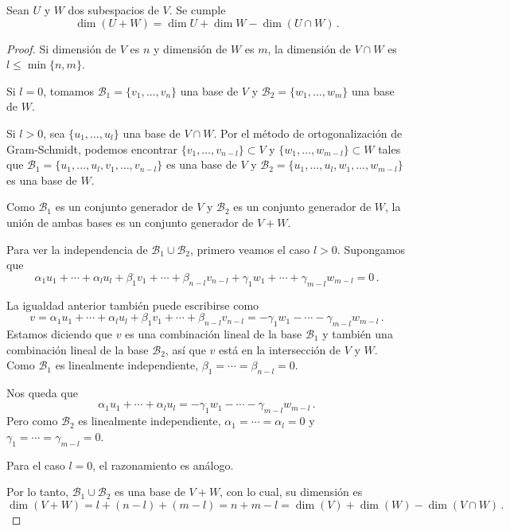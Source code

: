 \begin{prop}
  \label{prop:formula-dimension}
  Sean $U$ y $W$ dos subespacios de $V$. Se cumple
  \[
    \dim(U+W) = \dim U + \dim W - \dim(U\cap W)\,.
  \]
\end{prop}
\begin{proof}
  Si dimensión de $V$ es $n$ y dimensión de $W$ es $m$, la dimensión de $V\cap W$ es $l\leq\min\{n,m\}$.

  Si $l=0$, tomamos $\mathcal{B}_1 = \{v_1,\dots,v_{n}\}$ una base de $V$ y $\mathcal{B}_2 = \{w_1,\dots,w_{m}\}$ una base de $W$.

  Si $l>0$, sea $\{u_1,\dots,u_{l}\}$ una base de $V\cap W$. Por el método de ortogonalización de Gram-Schmidt, podemos encontrar $\{v_1,\dots,v_{n-l}\}\subset V$ y $\{w_1,\dots,w_{m-l}\}\subset W$ tales que $\mathcal{B}_1=\{u_1,\dots,u_{l}, v_1,\dots,v_{n-l}\}$ es una base de $V$ y $\mathcal{B}_2=\{u_1,\dots,u_{l}, w_1,\dots,w_{m-l}\}$ es una base de $W$.

  Como $\mathcal{B}_1$ es un conjunto generador de $V$ y $\mathcal{B}_2$ es un conjunto generador de $W$, la unión de ambas bases es un conjunto generador de $V+W$.

  Para ver la independencia de $\mathcal{B}_1\cup\mathcal{B}_2$, primero veamos el caso $l>0$. Supongamos que
  \[
    \alpha_1 u_1 + \cdots + \alpha_l u_l + \beta_1 v_1 + \cdots + \beta_{n-l} v_{n-l} + \gamma_1 w_1 + \cdots + \gamma_{m-l} w_{m-l} = 0\,.
  \]

  La igualdad anterior también puede escribirse como
  \[
    v=\alpha_1 u_1 + \cdots + \alpha_l u_l + \beta_1 v_1 + \cdots + \beta_{n-l} v_{n-l} = - \gamma_1 w_1 - \cdots - \gamma_{m-l} w_{m-l}\,.
  \]
  Estamos diciendo que $v$ es una combinación lineal de la base $\mathcal{B}_1$ y también una combinación lineal de la base $\mathcal{B}_2$, así que $v$ está en la intersección de $V$ y $W$.
  Como $\mathcal{B}_1$ es linealmente independiente, $\beta_1 = \cdots = \beta_{n-l} = 0$.

  Nos queda que
  \[
    \alpha_1 u_1 + \cdots + \alpha_l u_l = - \gamma_1 w_1 - \cdots - \gamma_{m-l} w_{m-l}\,.
  \]
  Pero como $\mathcal{B}_2$ es linealmente independiente, $\alpha_1 = \cdots = \alpha_l = 0$ y $\gamma_1 = \cdots = \gamma_{m-l} = 0$.

  Para el caso $l=0$, el razonamiento es análogo.

  Por lo tanto, $\mathcal{B}_1\cup\mathcal{B}_2$ es una base de $V+W$, con lo cual, su dimensión es
  \[
    \dim(V+W) = l + (n-l) + (m-l) = n + m - l = \dim(V) + \dim(W) - \dim(V\cap W)\,.
  \]
\end{proof}

